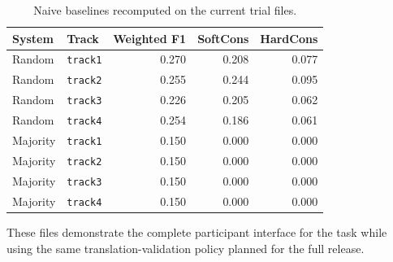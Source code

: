 \documentclass[10pt]{article}
\begin{document}
\begin{table}[h]
\centering
\small
\begin{tabular}{llrrr}
\toprule
System & Track & Weighted F1 & SoftCons & HardCons \\
\midrule
Random & \texttt{track1} & 0.270 & 0.208 & 0.077 \\
Random & \texttt{track2} & 0.255 & 0.244 & 0.095 \\
Random & \texttt{track3} & 0.226 & 0.205 & 0.062 \\
Random & \texttt{track4} & 0.254 & 0.186 & 0.061 \\
\midrule
Majority & \texttt{track1} & 0.150 & 0.000 & 0.000 \\
Majority & \texttt{track2} & 0.150 & 0.000 & 0.000 \\
Majority & \texttt{track3} & 0.150 & 0.000 & 0.000 \\
Majority & \texttt{track4} & 0.150 & 0.000 & 0.000 \\
\bottomrule
\end{tabular}
\caption{Naive baselines recomputed on the current trial files.}
\label{tab:trial-baselines}
\end{table}

These files demonstrate the complete participant interface for the task while
using the same translation-validation policy planned for the full release.
\end{document}
